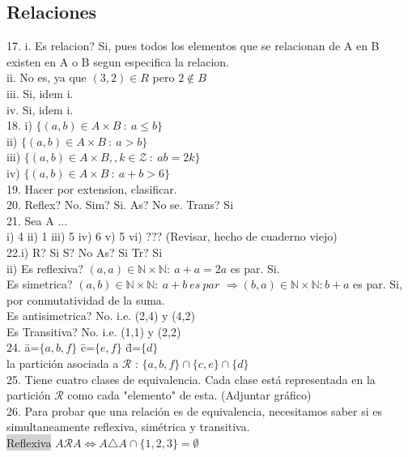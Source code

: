 \documentclass[a4paper,11pt]{article}
\begin{document}
\subsection{Relaciones}
17. i. Es relacion? Si, pues todos los elementos que se relacionan de A en B existen en A o B segun especifica la relacion.\\
ii. No es, ya que \( (3,2) \in R\) pero \(2 \not\in B\)\\
iii. Si, idem i.\\
iv. Si, idem i. \\
18. i) \(\{(a,b)\in A \times B\: : \: a\leq b\}\)\\
ii) \(\{(a,b)\in A \times B\: : \: a > b\}\)\\
iii) \(\{(a,b)\in A \times B, , k \in \mathcal{Z}\: : \: ab = 2k\}\)\\
iv) \(\{(a,b)\in A \times B\: : \: a + b > 6\}\)\\
19. Hacer por extension, clasificar.\\
20. Reflex?  No. Sim? Si. As? No se. Trans? Si\\
21. Sea A ... \\
i) 4 ii) 1 iii) 5 iv) 6 v) 5 vi) ??? (Revisar, hecho de cuaderno viejo)\\
22.i) R? Si S? No As? Si Tr? Si\\
ii) Es reflexiva? \((a,a) \in \mathbb{N} \times \mathbb{N} : \: a+a=2a\) es par. Si. \\
Es simetrica? \((a,b) \in \mathbb{N} \times \mathbb{N} : \: a+b\: es\:par \) \(\Rightarrow(b,a) \in \mathbb{N} \times \mathbb{N}: b+a\) es par. Si, por conmutatividad de la suma. \\
Es antisimetrica? No. i.e. (2,4) y (4,2)\\
Es Transitiva? No. i.e. (1,1) y (2,2) \\
24. \={a}=\(\{a,b,f\}\) \={c}=\(\{e,f\}\) \={d}=\(\{d\}\)\\
la partición asociada a \(\mathcal{R}\) : \(\{a,b,f\} \cap \{c,e\} \cap \{d\}\)\\
25. Tiene cuatro clases de equivalencia. Cada clase está representada en la partición \(\mathcal{R}\) como cada "elemento" de esta. (Adjuntar gráfico)\\
26. Para probar que una relación es de equivalencia, necesitamos saber si es simultaneamente reflexiva, simétrica y transitiva.\\
\colorbox{lightgray}{Reflexiva} \(A \mathcal{R}A \Leftrightarrow A \triangle A \cap \{1,2,3\}=\emptyset\) \\
\end{document}
